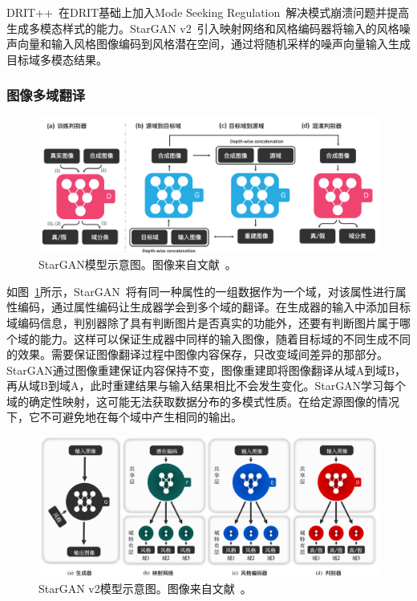 DRIT++~\cite{lee2020drit++}在DRIT基础上加入Mode Seeking Regulation~\cite{mao2019mode}解决模式崩溃问题并提高生成多模态样式的能力。StarGAN v2~\cite{choi2020stargan}引入映射网络和风格编码器将输入的风格噪声向量和输入风格图像编码到风格潜在空间，通过将随机采样的噪声向量输入生成目标域多模态结果。

\subsubsection{图像多域翻译}

\begin{figure}[ht]
    \centering
	\includegraphics[width=\textwidth]{figures/star.png}
	\caption{StarGAN模型示意图。图像来自文献~\cite{choi2018stargan}。}
	\label{fig:star}
\end{figure}

如图~\ref{fig:star}所示，StarGAN~\cite{choi2018stargan}将有同一种属性的一组数据作为一个域，对该属性进行属性编码，通过属性编码让生成器学会到多个域的翻译。在生成器的输入中添加目标域编码信息，判别器除了具有判断图片是否真实的功能外，还要有判断图片属于哪个域的能力。这样可以保证生成器中同样的输入图像，随着目标域的不同生成不同的效果。需要保证图像翻译过程中图像内容保存，只改变域间差异的那部分。StarGAN通过图像重建保证内容保持不变，图像重建即将图像翻译从域A到域B，再从域B到域A，此时重建结果与输入结果相比不会发生变化。StarGAN学习每个域的确定性映射，这可能无法获取数据分布的多模式性质。在给定源图像的情况下，它不可避免地在每个域中产生相同的输出。

\begin{figure}[ht]
    \centering
	\includegraphics[width=\textwidth]{figures/starv2.png}
	\caption{StarGAN v2模型示意图。图像来自文献~\cite{choi2020stargan}。}
	\label{fig:starv2}
\end{figure}


